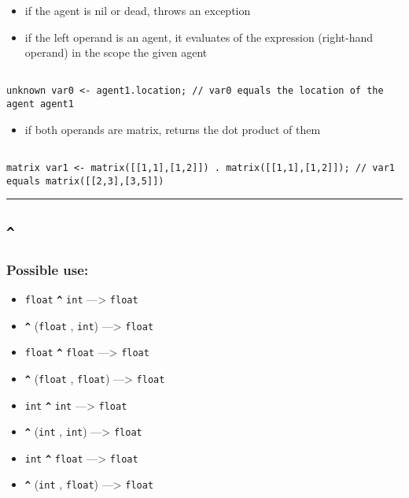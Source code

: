 \documentclass[]{book}
\providecommand{\tightlist}{%
  \setlength{\itemsep}{0pt}\setlength{\parskip}{0pt}}
\theoremstyle{definition}
\theoremstyle{definition}
\theoremstyle{definition}
\theoremstyle{remark}
\begin{document}
\begin{itemize}
\tightlist
\item
  if the agent is nil or dead, throws an exception\\
\item
  if the left operand is an agent, it evaluates of the expression
  (right-hand operand) in the scope the given agent
\end{itemize}

\begin{verbatim}
 
unknown var0 <- agent1.location; // var0 equals the location of the agent agent1
\end{verbatim}

\begin{itemize}
\tightlist
\item
  if both operands are matrix, returns the dot product of them
\end{itemize}

\begin{verbatim}
 
matrix var1 <- matrix([[1,1],[1,2]]) . matrix([[1,1],[1,2]]); // var1 equals matrix([[2,3],[3,5]])
\end{verbatim}

\begin{center}\rule{0.5\linewidth}{\linethickness}\end{center}

\subsection{\texorpdfstring{\texttt{\^{}}}{\^{}}}\label{section-9}

\subsubsection{Possible use:}\label{possible-use-8}

\begin{itemize}
\tightlist
\item
  \texttt{float} \textbf{\texttt{\^{}}} \texttt{int} ---\textgreater{}
  \texttt{float}
\item
  \textbf{\texttt{\^{}}} (\texttt{float} , \texttt{int})
  ---\textgreater{} \texttt{float}
\item
  \texttt{float} \textbf{\texttt{\^{}}} \texttt{float} ---\textgreater{}
  \texttt{float}
\item
  \textbf{\texttt{\^{}}} (\texttt{float} , \texttt{float})
  ---\textgreater{} \texttt{float}
\item
  \texttt{int} \textbf{\texttt{\^{}}} \texttt{int} ---\textgreater{}
  \texttt{float}
\item
  \textbf{\texttt{\^{}}} (\texttt{int} , \texttt{int}) ---\textgreater{}
  \texttt{float}
\item
  \texttt{int} \textbf{\texttt{\^{}}} \texttt{float} ---\textgreater{}
  \texttt{float}
\item
  \textbf{\texttt{\^{}}} (\texttt{int} , \texttt{float})
  ---\textgreater{} \texttt{float}
\end{itemize}
\end{document}
